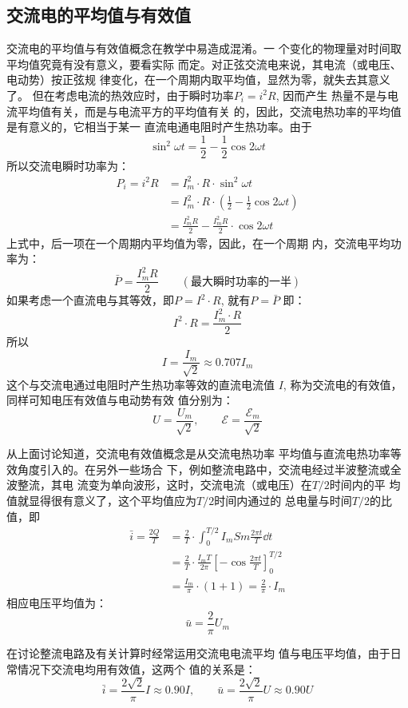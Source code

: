 \subsection{交流电的平均值与有效值}
交流电的平均值与有效值概念在教学中易造成混淆。一
个变化的物理量对时间取平均值究竟有没有意义，要看实际
而定。对正弦交流电来说，其电流（或电压、电动势）按正弦规
律变化，在一个周期内取平均值，显然为零，就失去其意义了。
但在考虑电流的热效应时，由于瞬时功率$P_i=i^2R$, 因而产生
热量不是与电流平均值有关，而是与电流平方的平均值有关
的，因此，交流电热功率的平均值是有意义的，它相当于某一
直流电通电阻时产生热功率。由于
\[\sin^2\omega t=\frac{1}{2}-\frac{1}{2}\cos2\omega t\]
所以交流电瞬时功率为：
\[\begin{split}
    P_i=i^2R &=I^2_m\cdot  R\cdot \sin^2 \omega t\\
    &=I^2_m\cdot  R\cdot \left(\frac{1}{2}-\frac{1}{2}\cos2\omega t\right)\\
    &=\frac{I_m^2 R}{2}-\frac{I_m^2 R}{2}\cdot \cos2\omega t
\end{split}\]
上式中，后一项在一个周期内平均值为零，因此，在一个周期
内，交流电平均功率为：
\[\bar P=\frac{I_m^2 R}{2}\qquad (\text{最大瞬时功率的一半})\]
如果考虑一个直流电与其等效，即$P=I^2\cdot R$, 就有$P=\bar P$
即：
\[I^2\cdot R=\frac{I^2_m\cdot R}{2}\]
所以
\[I=\frac{I_m}{\sqrt{2}}\approx 0.707I_m\]
这个与交流电通过电阻时产生热功率等效的直流电流值
$I$, 称为交流电的有效值，同样可知电压有效值与电动势有效
值分别为：
\[U=\frac{U_m}{\sqrt{2}},\qquad \mathcal{E}=\frac{\mathcal{E}_m}{\sqrt{2}}\]

从上面讨论知道，交流电有效值概念是从交流电热功率
平均值与直流电热功率等效角度引入的。在另外一些场合
下，例如整流电路中，交流电经过半波整流或全波整流，其电
流变为单向波形，这时，交流电流（或电压）在$T/2$时间内的平
均值就显得很有意义了，这个平均值应为$T/2$时间内通过的
总电量与时间$T/2$的比值，即
\[\begin{split}
\bar i=\frac{2Q}{T}&=\frac{2}{T}\cdot \int^{T/2}_0 I_m Sm\frac{2\pi t}{T}\dd t\\
&=\frac{2}{T}\cdot \frac{I_m T}{2\pi} \left[-\cos\frac{2\pi t}{T}\right]^{T/2}_0\\
&=\frac{I_m}{\pi}\cdot (1+1)=\frac{2}{\pi}\cdot I_m
\end{split}
    \]
相应电压平均值为：
\[\bar u=\frac{2}{\pi}U_m\]

在讨论整流电路及有关计算时经常运用交流电电流平均
值与电压平均值，由于日常情况下交流电均用有效值，这两个
值的关系是：
\[\bar i=\frac{2\sqrt{2}}{\pi}I\approx 0.90I,\qquad \bar u=\frac{2\sqrt{2}}{\pi}U\approx 0.90U\]

